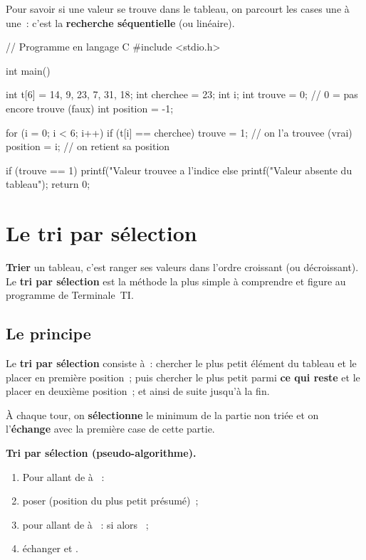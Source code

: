 Pour savoir si une valeur  se trouve dans le tableau, on parcourt
les cases une à une~: c'est la \textbf{recherche séquentielle} (ou linéaire).

\begin{codec}
// Programme en langage C
#include <stdio.h>

int main() {
    int t[6] = {14, 9, 23, 7, 31, 18};
    int cherchee = 23;
    int i;
    int trouve = 0;     // 0 = pas encore trouve (faux)
    int position = -1;

    for (i = 0; i < 6; i++) {
        if (t[i] == cherchee) {
            trouve = 1;         // on l'a trouvee (vrai)
            position = i;       // on retient sa position
        }
    }

    if (trouve == 1) {
        printf("Valeur trouvee a l'indice %
    } else {
        printf("Valeur absente du tableau\n");
    }
    return 0;
}
\end{codec}


\section{Le tri par sélection}

\textbf{Trier} un tableau, c'est ranger ses valeurs dans l'ordre croissant (ou
décroissant). Le \textbf{tri par sélection} est la méthode la plus simple à
comprendre et figure au programme de Terminale~TI.

\subsection{Le principe}

\begin{definition}
Le \textbf{tri par sélection} consiste à~: chercher le plus petit élément du
tableau et le placer en première position~; puis chercher le plus petit parmi
\textbf{ce qui reste} et le placer en deuxième position~; et ainsi de suite jusqu'à
la fin.
\end{definition}

À chaque tour, on \textbf{sélectionne} le minimum de la partie non triée et on
l'\textbf{échange} avec la première case de cette partie.

\begin{methode}
\textbf{Tri par sélection (pseudo-algorithme).}
\begin{enumerate}[label=\arabic*)]
  \item Pour  allant de  à ~:
  \item \quad poser  (position du plus petit présumé)~;
  \item \quad pour  allant de  à ~: si  alors ~;
  \item \quad échanger  et .
\end{enumerate}
\end{methode}

